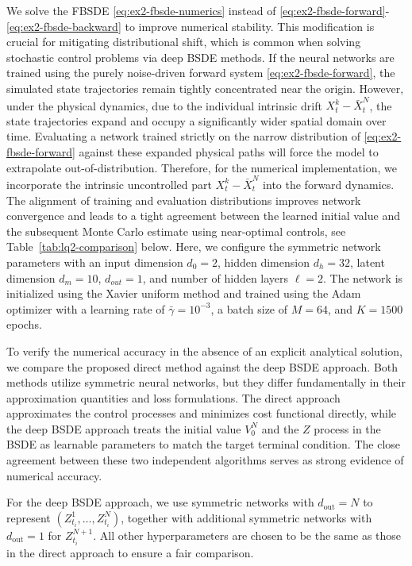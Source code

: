 \documentclass[11pt]{article}
\numberwithin{equation}{section}
\theoremstyle{plain}
\theoremstyle{definition}
\theoremstyle{remark}
\begin{document}
		We solve the FBSDE \eqref{eq:ex2-fbsde-numerics} instead of \eqref{eq:ex2-fbsde-forward}-\eqref{eq:ex2-fbsde-backward} to improve numerical stability. This modification is crucial for mitigating distributional shift, which is common when solving stochastic control problems via deep BSDE methods. If the neural networks are trained using the purely noise-driven forward system \eqref{eq:ex2-fbsde-forward}, the simulated state trajectories remain tightly concentrated near the origin. However, under the physical dynamics, due to the individual intrinsic drift $X_t^k - \bar{X}_t^N$, the state trajectories expand and occupy a significantly wider spatial domain over time. Evaluating a network trained strictly on the narrow distribution of \eqref{eq:ex2-fbsde-forward} against these expanded physical paths will force the model to extrapolate out-of-distribution. Therefore, for the numerical implementation, we incorporate the intrinsic uncontrolled part $X_t^k - \bar{X}_t^N$ into the forward dynamics. The alignment of training and evaluation distributions improves network convergence and leads to a tight agreement between the learned initial value and the subsequent Monte Carlo estimate using near-optimal controls, see Table~\ref{tab:lq2-comparison} below. Here, we configure the symmetric network parameters with an input dimension $d_0=2$, hidden dimension $d_h=32$, latent dimension $d_m=10$, $d_{out}=1$, and number of hidden layers $\ell=2$. The network is initialized using the Xavier uniform method and trained using the Adam optimizer with a learning rate of $\bar{\gamma} = 10^{-3}$, a batch size of $M=64$, and $K=1500$ epochs. 
	
	To verify the numerical accuracy in the absence of an explicit analytical solution, we compare the proposed direct method against the deep BSDE approach. Both methods utilize symmetric neural networks, but they differ fundamentally in their approximation quantities and loss formulations. The direct approach approximates the control processes and minimizes cost functional directly, while the deep BSDE approach treats the initial value $V_0^N$ and the $Z$ process in the BSDE as learnable parameters to match the target terminal condition. The close agreement between these two independent algorithms serves as strong evidence of numerical accuracy. 
	
	For the deep BSDE approach, we use symmetric networks with $d_{\mathrm{out}}=N$ to represent $(Z_{t_i}^1,\dots,Z_{t_i}^N)$, together with additional symmetric networks with $d_{\mathrm{out}}=1$ for $Z_{t_i}^{N+1}$. All other hyperparameters are chosen to be the same as those in the direct approach to ensure a fair comparison. 
	
\end{document}
